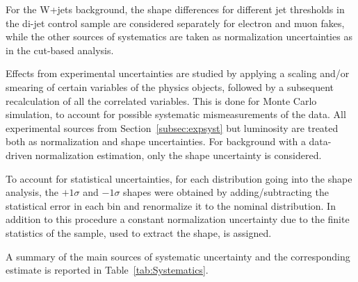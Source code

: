 For the W+jets background, the shape differences for different jet \pt thresholds in the 
di-jet control sample are considered separately for electron and muon fakes, while the
other sources of systematics are taken as normalization uncertainties as in the cut-based
analysis.

Effects from experimental uncertainties are studied by applying a scaling and/or
smearing of certain variables of the physics objects, followed by a subsequent
recalculation of all the correlated variables. This is done for Monte Carlo
simulation, to account for possible systematic mismeasurements of the data.
All experimental sources from Section~\ref{subsec:expsyst} but luminosity
are treated both as normalization and shape uncertainties.
For background with a data-driven normalization estimation,
only the shape uncertainty is considered.

To account for statistical uncertainties, for each distribution going into the shape analysis, 
the $+1\sigma$ and $-1\sigma$ shapes were obtained by adding/subtracting the statistical error 
in each bin and renormalize it to the nominal distribution. In addition to this procedure a constant 
normalization uncertainty due to the finite statistics of the sample, used to extract the shape, is assigned.

A summary of the main sources of systematic uncertainty and the corresponding estimate is reported in Table~\ref{tab:Systematics}.

